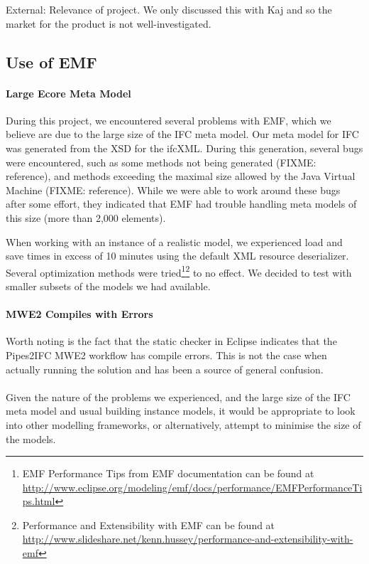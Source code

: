 External:
Relevance of project. We only discussed this with Kaj and so the market for the product is not well-investigated.




\subsection{Use of EMF}
\label{subsec:use_of_EMF}
\paragraph{Large Ecore Meta Model} During this project, we encountered several problems with EMF, which we believe are due to the large size of the IFC meta model. Our meta model for IFC was generated from the XSD for the ifcXML. During this generation, several bugs were encountered, such as some methods not being generated (FIXME: reference), and methods exceeding the maximal size allowed by the Java Virtual Machine (FIXME: reference). While we were able to work around these bugs after some effort, they indicated that EMF had trouble handling meta models of this size (more than 2,000 elements).

When working with an instance of a realistic model, we experienced load and save times in excess of 10 minutes using the default XML resource deserializer. Several optimization methods were tried\footnote{EMF Performance Tips from EMF documentation can be found at \url{http://www.eclipse.org/modeling/emf/docs/performance/EMFPerformanceTips.html}}\footnote{Performance and Extensibility with EMF can be found at \url{http://www.slideshare.net/kenn.hussey/performance-and-extensibility-with-emf}} to no effect. We decided to test with smaller subsets of the models we had available.

\paragraph{MWE2 Compiles with Errors} Worth noting is the fact that the static checker in Eclipse indicates that the Pipes2IFC MWE2 workflow has compile errors. This is not the case when actually running the solution and has been a source of general confusion.
\paragraph{}
Given the nature of the problems we experienced, and the large size of the IFC meta model and usual building instance models, it would be appropriate to look into other modelling frameworks, or alternatively, attempt to minimise the size of the models.
